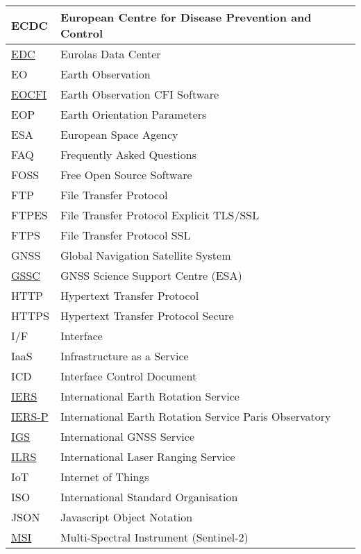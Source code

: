 \documentclass[dec_sum_main.tex]{subfiles}
\begin{document}
\begin{longtable}{|m{2.8cm}|m{10cm}|}
	ECDC & European Centre for Disease Prevention and Control \\ \hline
	\href{https://edc.dgfi.tum.de/en/}{EDC} & Eurolas Data Center \\ \hline
	EO & Earth Observation \\ \hline
	\href{https://eop-cfi.esa.int/index.php/mission-cfi-software/eocfi-software}{EOCFI} & Earth Observation CFI Software \\ \hline
	EOP & Earth Orientation Parameters \\ \hline
	ESA & European Space Agency \\ \hline
	FAQ & Frequently Asked Questions \\ \hline
	FOSS & Free Open Source Software \\ \hline
	FTP & File Transfer Protocol \\ \hline
	FTPES & File Transfer Protocol Explicit TLS/SSL \\ \hline
	FTPS & File Transfer Protocol SSL \\ \hline
	GNSS & Global Navigation Satellite System \\ \hline
	\href{https://gssc.esa.int/#about-us}{GSSC} & GNSS Science Support Centre (ESA) \\ \hline
	HTTP & Hypertext Transfer Protocol \\ \hline
	HTTPS & Hypertext Transfer Protocol Secure\\ \hline
	I/F & Interface \\ \hline
	IaaS & Infrastructure as a Service \\ \hline
	ICD & Interface Control Document \\ \hline
	\href{https://www.iers.org/IERS/EN/Publications/Bulletins/bulletins.html}{IERS} & International Earth Rotation Service \\ \hline
	\href{https://hpiers.obspm.fr/}{IERS-P} & International Earth Rotation Service Paris Observatory\\ \hline
	\href{https://igs.org/about/#products}{IGS} & International GNSS Service \\ \hline
	\href{https://ilrs.gsfc.nasa.gov/data_and_products/data_centers/index.html}{ILRS} & International Laser Ranging Service \\ \hline
	IoT & Internet of Things \\ \hline
	ISO & International Standard Organisation \\ \hline
	JSON & Javascript Object Notation \\ \hline
	\href{https://sentinels.copernicus.eu/web/sentinel/technical-guides/sentinel-2-msi/msi-instrument}{MSI} & Multi-Spectral Instrument (Sentinel-2) \\ \hline

\end{longtable}
\end{document}

